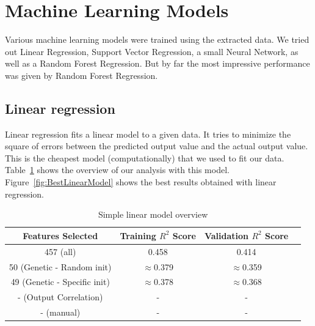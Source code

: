 \documentclass[11pt]{article}
\begin{document}

\section{Machine Learning Models}
\label{MachineLearningModelslabel}
Various machine learning models were trained using the extracted data.
We tried out Linear Regression,
Support Vector Regression,
a small Neural Network,
as well as a Random Forest Regression.
But by far the most impressive performance was given by Random Forest Regression.

\subsection{Linear regression}
Linear regression fits a linear model to a given data.
It tries to minimize the square of errors between the predicted output value and the actual output value.
This is the cheapest model (computationally) that we used to fit our data.
Table~\ref{table:1} shows the overview of our analysis with this model.
Figure~\ref{fig:BestLinearModel} shows the best results obtained with linear regression.

\begin{table} [h!]
\centering
 \begin{tabular}{ | c | c | c | c | }
\hline
\textbf{Features Selected} & \textbf{Training $R^2$ Score} & \textbf{Validation $R^2$ Score} \\ [0.5 ex]
\hline \hline
457 (all) & 0.458 & 0.414\\
50 (Genetic - Random init)\footnotemark[1] & $\approx$0.379 & $\approx$0.359\\
49 (Genetic - Specific init)\footnotemark[1] & $\approx$0.378 & $\approx$0.368  \\
- (Output Correlation) & - & -  \\ 
- (manual) & - & -  \\ [1ex]
\hline
\end{tabular}
\caption{Simple linear model overview}
\label {table:1}
\end{table}
\end{document}
